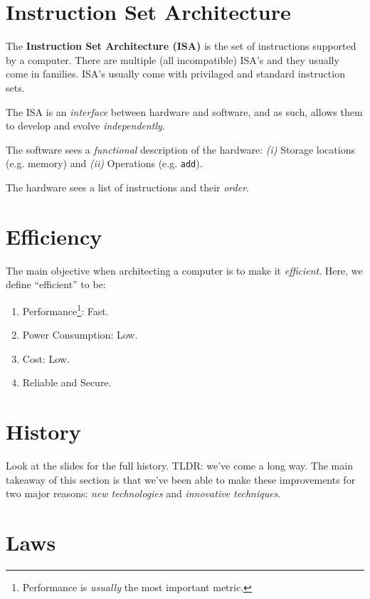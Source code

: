 \documentclass{report}
\newcommand{\definition}[2]{\begin{tcolorbox}[title={Definition: #1}]{#2}\end{tcolorbox}}
\begin{document}
\section{Instruction Set Architecture}
\definition{Instruction Set Architecture}{
  The \textbf{Instruction Set Architecture (ISA)} is the set of instructions supported by a
  computer. There are multiple (all incompatible) ISA's and they usually come in families. ISA's
  usually come with privilaged and standard instruction sets. 
}

The ISA is an \textit{interface} between hardware and software, and as such, allows them to develop
and evolve \textit{independently}.

The software sees a \textit{functional} description of the hardware: \textit{(i)} Storage locations
(e.g. memory) and \textit{(ii)} Operations (e.g. \texttt{add}).

The hardware sees a list of instructions and their \textit{order}.





\section{Efficiency}
The main objective when architecting a computer is to make it \textit{efficient}. Here, we define
``efficient'' to be:

\begin{enumerate}[label=\textit{(\roman*)}] 
\item Performance\footnote{Performance is \textit{usually} the most important metric.}: Fast.
\item Power Consumption: Low.
\item Cost: Low.
\item Reliable and Secure.
\end{enumerate}





\section{History}
Look at the slides for the full history. TLDR: we've come a long way. The main takeaway of this
section is that we've been able to make these improvements for two major reasons: \textit{new
  technologies} and \textit{innovative techniques}.





\section{Laws}
\end{document}
